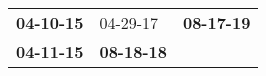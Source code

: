 \begin{supertabular}{p{0.33\columnwidth}p{0.33\columnwidth}p{0.33\columnwidth}}
 \textbf{04-10-15\textsuperscript{}} &           04-29-17\textsuperscript{} &  \textbf{08-17-19\textsuperscript{}} \\
 \textbf{04-11-15\textsuperscript{}} &  \textbf{08-18-18\textsuperscript{}} &                                      \\
\end{supertabular}
